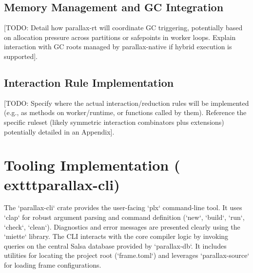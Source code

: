 \subsection{Memory Management and GC Integration}
[TODO: Detail how parallax-rt will coordinate GC triggering, potentially based on allocation pressure across partitions or safepoints in worker loops. Explain interaction with GC roots managed by parallax-native if hybrid execution is supported].

\subsection{Interaction Rule Implementation}
[TODO: Specify where the actual interaction/reduction rules will be implemented (e.g., as methods on worker/runtime, or functions called by them). Reference the specific ruleset (likely symmetric interaction combinators plus extensions) potentially detailed in an Appendix].

\section{Tooling Implementation (	exttt{parallax-cli})} %
The `parallax-cli` crate provides the user-facing `plx` command-line tool. It uses `clap` for robust argument parsing and command definition (`new`, `build`, `run`, `check`, `clean`). Diagnostics and error messages are presented clearly using the `miette` library. The CLI interacts with the core compiler logic by invoking queries on the central Salsa database provided by `parallax-db`. It includes utilities for locating the project root (`frame.toml`) and leverages `parallax-source` for loading frame configurations.

